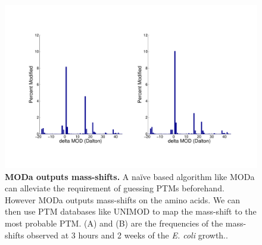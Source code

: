 \documentclass[12pt]{article}
\begin{document}
\clearpage
\begin{figure}[!ht]
\centerline{\includegraphics[width=8in]{Figures/PTMdalton.pdf}}
\caption{\label{fig:PTMinDalton}\textbf{MODa outputs mass-shifts.} A naïve based algorithm like MODa can alleviate the requirement of guessing PTMs beforehand. However MODa outputs mass-shifts on the amino acids. We can then use PTM databases like UNIMOD to map the mass-shift to the most probable PTM. (A) and (B) are the frequencies of the mass-shifts observed  at 3 hours and 2 weeks of the \emph{E. coli} growth..}
\end{figure}
\end{document}
